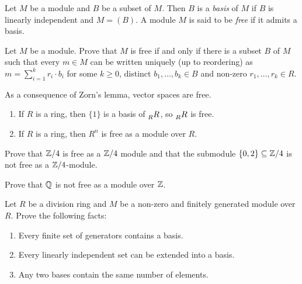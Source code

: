 \begin{definition}
    Let $M$ be a module and $B$ be a subset of $M$. Then $B$ is a \emph{basis} of $M$ if
    $B$ is linearly independent and $M=(B)$. A module $M$ is said to be \emph{free} if it admits a basis.   
\end{definition}

\begin{exercise}
    \label{xca:free_uniqueness}
    Let $M$ be a module. Prove that $M$ is free if and only if there is a
    subset $B$ of $M$ such that every $m\in M$ can be written uniquely (up to
    reordering) as $m=\sum_{i=1}^k r_i\cdot b_i$ for some $k\geq0$, distinct
    $b_1,\dots,b_k\in B$ and non-zero $r_1,\dots,r_k\in R$.
\end{exercise}

As a consequence of Zorn's lemma, 
vector spaces are free. 

\begin{example}
\leavevmode
\begin{enumerate}
    \item If $R$ is a ring, then $\{1\}$ is a basis of $\prescript{}{R}{R}$, so
      $\prescript{}{R}{R}$ is free.
    \item If $R$ is a ring, then $R^n$ is free as a module over $R$. 
\end{enumerate}
\end{example}

\begin{exercise}
    Prove that $\mathbb{Z}/4$ is free as a $\mathbb{Z}/4$ module and that the submodule 
    $\{0,2\}\subseteq \mathbb{Z}/4$ is not free as a $\mathbb{Z}/4$-module.
\end{exercise}
\begin{exercise}
\label{xca:Q_not_free}
    Prove that $\mathbb{Q}$ is not free as a module over $\mathbb{Z}$. 
\end{exercise}

\begin{exercise}
\label{xca:linear_algebra}
    Let $R$ be a division ring and $M$ be a non-zero and finitely generated module over $R$.
    Prove the following facts:
    \begin{enumerate}
        \item Every finite set of generators contains a basis.
        \item Every linearly independent set can be extended into a basis.
        \item Any two bases contain the same number of elements.
    \end{enumerate}
\end{exercise}

